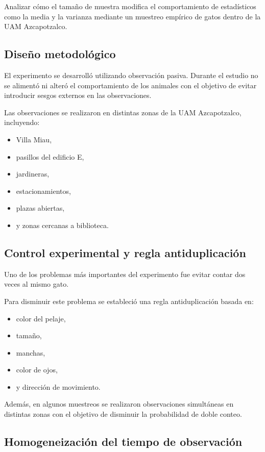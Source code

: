 Analizar cómo el tamaño de muestra modifica el comportamiento de estadísticos como la media y la varianza mediante un muestreo empírico de gatos dentro de la UAM Azcapotzalco.

\subsection{Diseño metodológico}

El experimento se desarrolló utilizando observación pasiva. Durante el estudio no se alimentó ni alteró el comportamiento de los animales con el objetivo de evitar introducir sesgos externos en las observaciones.

Las observaciones se realizaron en distintas zonas de la UAM Azcapotzalco, incluyendo:

\begin{itemize}
\item Villa Miau,
\item pasillos del edificio E,
\item jardineras,
\item estacionamientos,
\item plazas abiertas,
\item y zonas cercanas a biblioteca.
\end{itemize}

\subsection{Control experimental y regla antiduplicación}

Uno de los problemas más importantes del experimento fue evitar contar dos veces al mismo gato.

Para disminuir este problema se estableció una regla antiduplicación basada en:

\begin{itemize}
\item color del pelaje,
\item tamaño,
\item manchas,
\item color de ojos,
\item y dirección de movimiento.
\end{itemize}

Además, en algunos muestreos se realizaron observaciones simultáneas en distintas zonas con el objetivo de disminuir la probabilidad de doble conteo.

\subsection{Homogeneización del tiempo de observación}

